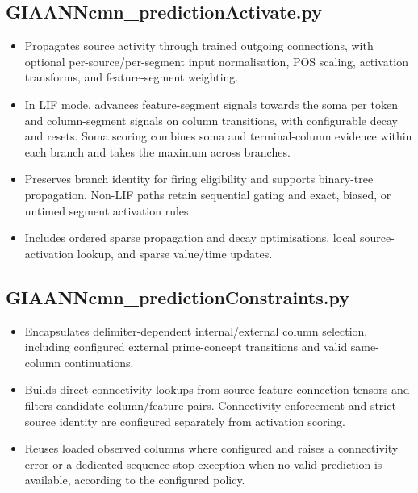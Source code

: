 \subsection{GIAANNcmn\_predictionActivate.py}
\begin{itemize}
	\item Propagates source activity through trained outgoing connections, with optional per-source/per-segment input normalisation, POS scaling, activation transforms, and feature-segment weighting.
	\item In LIF mode, advances feature-segment signals towards the soma per token and column-segment signals on column transitions, with configurable decay and resets. Soma scoring combines soma and terminal-column evidence within each branch and takes the maximum across branches.
	\item Preserves branch identity for firing eligibility and supports binary-tree propagation. Non-LIF paths retain sequential gating and exact, biased, or untimed segment activation rules.
	\item Includes ordered sparse propagation and decay optimisations, local source-activation lookup, and sparse value/time updates.
\end{itemize}

\subsection{GIAANNcmn\_predictionConstraints.py}
\begin{itemize}
	\item Encapsulates delimiter-dependent internal/external column selection, including configured external prime-concept transitions and valid same-column continuations.
	\item Builds direct-connectivity lookups from source-feature connection tensors and filters candidate column/feature pairs. Connectivity enforcement and strict source identity are configured separately from activation scoring.
	\item Reuses loaded observed columns where configured and raises a connectivity error or a dedicated sequence-stop exception when no valid prediction is available, according to the configured policy.
\end{itemize}

